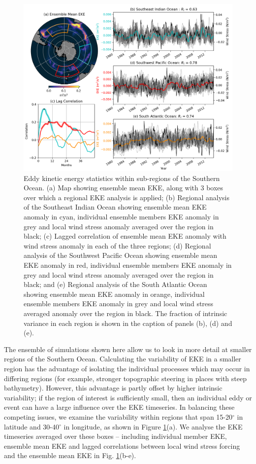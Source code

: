 \documentclass[linenumbers]{agujournal2019}
\begin{document}
\begin{figure}[t]
\begin{center}
\includegraphics[width=\hsize]{Figure3}
\caption{Eddy kinetic energy statistics within sub-regions of the Southern Ocean. (a) Map showing ensemble mean EKE, along with 3 boxes over which a regional EKE analysis is applied; (b) Regional analysis of the Southeast Indian Ocean showing ensemble mean EKE anomaly in cyan, individual ensemble members EKE anomaly in grey and local wind stress anomaly averaged over the region in black; (c) Lagged correlation of ensemble mean EKE anomaly with wind stress anomaly in each of the three regions; (d) Regional analysis of the Southwest Pacific Ocean showing ensemble mean EKE anomaly in red, individual ensemble members EKE anomaly in grey and local wind stress anomaly averaged over the region in black; and (e) Regional analysis of the South Atlantic Ocean showing ensemble mean EKE anomaly in orange, individual ensemble members EKE anomaly in grey and local wind stress averaged anomaly over the region in black. The fraction of intrinsic variance in each region is shown in the caption of panels (b), (d) and (e).}
\label{Fig:3}
\end{center}
\end{figure}

The ensemble of simulations shown here allow us to look in more detail at smaller regions of the Southern Ocean.
Calculating the variability of EKE in a smaller region has the advantage of isolating the individual processes which may occur in differing regions (for example, stronger topographic steering in places with steep bathymetry).
However, this advantage is partly offset by higher intrinsic variability;  if the region of interest is sufficiently small, then an individual eddy or event can have a large influence over the EKE timeseries.
In balancing these competing issues, we examine the variability within regions that span 15-20$^\circ$ in latitude and 30-40$^\circ$ in longitude, as shown in Figure \ref{Fig:3}(a).
We analyse the EKE timeseries averaged over these boxes -- including individual member EKE, ensemble mean EKE and lagged correlations between local wind stress forcing and the ensemble mean EKE in Fig. \ref{Fig:3}(b-e).
\end{document}
